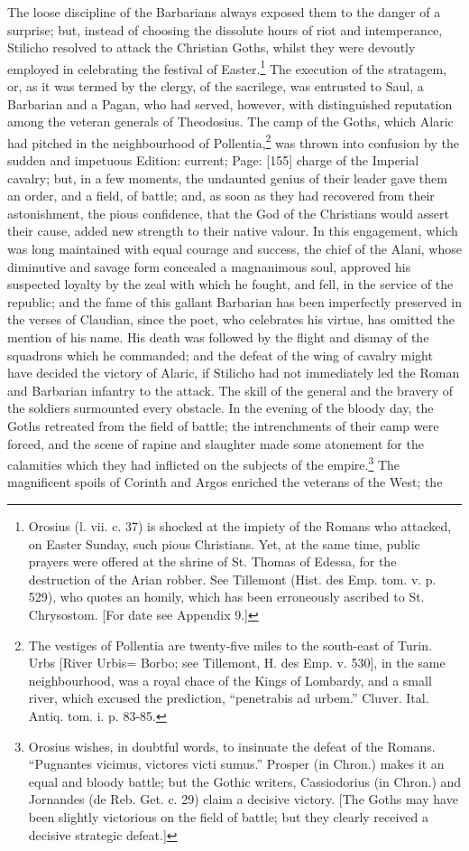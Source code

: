 The loose discipline of the Barbarians always exposed them to the danger of a surprise; but, instead of choosing the dissolute hours of riot and intemperance, Stilicho resolved to attack the Christian Goths, whilst they were devoutly employed in celebrating the festival of Easter.\footnote{Orosius (l. vii. c. 37) is shocked at the impiety of the Romans who attacked, on Easter Sunday, such pious Christians. Yet, at the same time, public prayers were offered at the shrine of St. Thomas of Edessa, for the destruction of the Arian robber. See Tillemont (Hist. des Emp. tom. v. p. 529), who quotes an homily, which has been erroneously ascribed to St. Chrysostom. [For date see Appendix 9.]} The execution of the stratagem, or, as it was termed by the clergy, of the sacrilege, was entrusted to Saul, a Barbarian and a Pagan, who had served, however, with distinguished reputation among the veteran generals of Theodosius. The camp of the Goths, which Alaric had pitched in the neighbourhood of Pollentia,\footnote{The vestiges of Pollentia are twenty-five miles to the south-east of Turin. Urbs [River Urbis= Borbo; see Tillemont, H. des Emp. v. 530], in the same neighbourhood, was a royal chace of the Kings of Lombardy, and a small river, which excused the prediction, \texthebrew{“}penetrabis ad urbem.\texthebrew{}” Cluver. Ital. Antiq. tom. i. p. 83-85.} was thrown into confusion by the sudden and impetuous Edition: current; Page: [155] charge of the Imperial cavalry; but, in a few moments, the undaunted genius of their leader gave them an order, and a field, of battle; and, as soon as they had recovered from their astonishment, the pious confidence, that the God of the Christians would assert their cause, added new strength to their native valour. In this engagement, which was long maintained with equal courage and success, the chief of the Alani, whose diminutive and savage form concealed a magnanimous soul, approved his suspected loyalty by the zeal with which he fought, and fell, in the service of the republic; and the fame of this gallant Barbarian has been imperfectly preserved in the verses of Claudian, since the poet, who celebrates his virtue, has omitted the mention of his name. His death was followed by the flight and dismay of the squadrons which he commanded; and the defeat of the wing of cavalry might have decided the victory of Alaric, if Stilicho had not immediately led the Roman and Barbarian infantry to the attack. The skill of the general and the bravery of the soldiers surmounted every obstacle. In the evening of the bloody day, the Goths retreated from the field of battle; the intrenchments of their camp were forced, and the scene of rapine and slaughter made some atonement for the calamities which they had inflicted on the subjects of the empire.\footnote{Orosius wishes, in doubtful words, to insinuate the defeat of the Romans. \texthebrew{“}Pugnantes vicimus, victores victi sumus.\texthebrew{}” Prosper (in Chron.) makes it an equal and bloody battle; but the Gothic writers, Cassiodorius (in Chron.) and Jornandes (de Reb. Get. c. 29) claim a decisive victory. [The Goths may have been slightly victorious on the field of battle; but they clearly received a decisive strategic defeat.]} The magnificent spoils of Corinth and Argos enriched the veterans of the West; the 